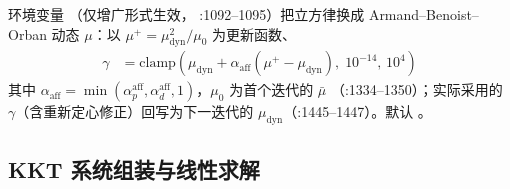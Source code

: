 环境变量 （仅增广形式生效，
:1092--1095）把立方律换成 Armand--Benoist--Orban 动态 $\mu$：以
$\mu^{+}=\mu_{\mathrm{dyn}}^{2}/\mu_0$ 为更新函数、
\begin{align*}
\gamma &= \mathrm{clamp}\!\left(
\mu_{\mathrm{dyn}} + \alpha_{\mathrm{aff}}(\mu^{+}-\mu_{\mathrm{dyn}}),
\;10^{-14},\,10^{4}\right)
\end{align*}
其中 $\alpha_{\mathrm{aff}}=\min(\alpha_p^{\mathrm{aff}},
\alpha_d^{\mathrm{aff}},1)$，$\mu_0$ 为首个迭代的 $\bar\mu$
（:1334--1350）；实际采用的 $\gamma$（含重新定心修正）回写为下一迭代的
$\mu_{\mathrm{dyn}}$（:1445--1447）。默认 。

\subsection{KKT 系统组装与线性求解}\label{subsec:pipm-kkt}

